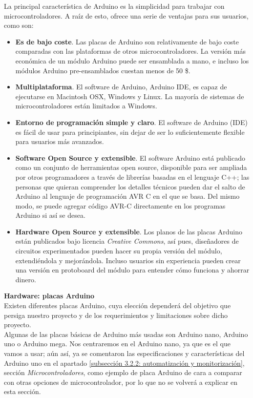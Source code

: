 \documentclass[12pt]{article}
\begin{document}
	\noindent La principal característica de Arduino es la simplicidad para trabajar con microcontroladores. A raíz de esto, ofrece una serie de ventajas para sus usuarios, como son:
	\begin{itemize}
		\item \textbf{Es de bajo coste}. Las placas de Arduino son relativamente de bajo coste comparadas con las plataformas de otros microcontroladores. La versión más económica de un módulo Arduino puede ser ensamblada a mano, e incluso los módulos Arduino pre-ensamblados cuestan menos de 50 \$.
		\item \textbf{Multiplataforma}. El software de Arduino, Arduino IDE, es capaz de ejecutarse en Macintosh OSX, Windows y Linux. La mayoría de sistemas de microcontroladores están limitados a Windows.
		\item  	\textbf{Entorno de programación simple y claro}. El software de Arduino (IDE) es fácil de usar para principiantes, sin dejar de ser lo suficientemente flexible para usuarios más avanzados.
		\item \textbf{Software Open Source y extensible}. El software Arduino está publicado como un conjunto de herramientas open source, disponible para ser ampliada por otros programadores a través de librerías basadas en el lenguaje C++; las personas que quieran comprender los detalles técnicos pueden dar el salto de Arduino al lenguaje de programación AVR C en el que se basa. Del mismo modo, se puede agregar código AVR-C directamente en los  programas Arduino si así se desea.
		\item \textbf{Hardware Open Source y extensible}. Los planos de las placas Arduino están publicados bajo licencia \textit{Creative Commons}, así pues, diseñadores de circuitos experimentados pueden hacer su propia versión del módulo, extendiéndola y mejorándola. Incluso usuarios sin experiencia pueden crear una versión en protoboard del módulo para entender cómo funciona y ahorrar dinero.
	
	\end{itemize}

	\noindent \textbf{Hardware: placas Arduino} \\
	
	\noindent Existen diferentes placas Arduino, cuya elección dependerá del objetivo que persiga nuestro proyecto y de los requerimientos y limitaciones sobre dicho proyecto. \\
	
	\noindent Algunas de las placas básicas de Arduino más usadas son Arduino nano, Arduino uno o Arduino mega. Nos centraremos en el Arduino nano, ya que es el que vamos a usar; aún así, ya se comentaron las especificaciones y características del Arduino uno en el apartado \ref{subsección 3.2.2: automatización y monitorización}, sección \textit{Microcontroladores}, como ejemplo de placa Arduino de cara a comparar con otras opciones de microcontrolador, por lo que no se volverá a explicar en esta sección.  \\
	
\end{document}
